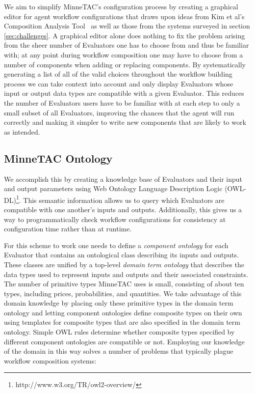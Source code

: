 \documentclass{article}
\begin{document}
We aim to simplify MinneTAC's configuration process by creating a graphical editor for agent workflow configurations that draws upon ideas from Kim et al's Composition Analysis Tool~\cite{kim2004intelligent} as well as those from the systems surveyed in section \ref{sec:challenges}.
A graphical editor alone does nothing to fix the problem arising from the sheer number of Evaluators one has to choose from and thus be familiar with; at any point during workflow composition one may have to choose from a number of components when adding or replacing components.
By systematically generating a list of all of the valid choices throughout the workflow building process we can take context into account and only display Evaluators whose input or output data types are compatible with a given Evaluator.
This reduces the number of Evaluators users have to be familiar with at each step to only a small subset of all Evaluators, improving the chances that the agent will run correctly and making it simpler to write new components that are likely to work as intended.

\subsection{MinneTAC Ontology}

We accomplish this by creating a knowledge base of Evaluators and their input and output parameters using Web Ontology Language Description Logic (OWL-DL)\footnote{http://www.w3.org/TR/owl2-overview/}.
This semantic information allows us to query which Evaluators are compatible with one another's inputs and outputs.
Additionally, this gives us a way to programmatically check workflow configurations for consistency at configuration time rather than at runtime.

For this scheme to work one needs to define a \emph{component ontology} for each Evaluator that contains an ontological class describing its inputs and outputs.
These classes are unified by a top-level \emph{domain term ontology} that describes the data types used to represent inputs and outputs and their associated constraints.
The number of primitive types MinneTAC uses is small, consisting of about ten types, including prices, probabilities, and quantities.
We take advantage of this domain knowledge by placing only these primitive types in the domain term ontology and letting component ontologies define composite types on their own using templates for composite types that are also specified in the domain term ontology.
Simple OWL rules determine whether composite types specified by different component ontologies are compatible or not.
Employing our knowledge of the domain in this way solves a number of problems that typically plague workflow composition systems:
\end{document}
